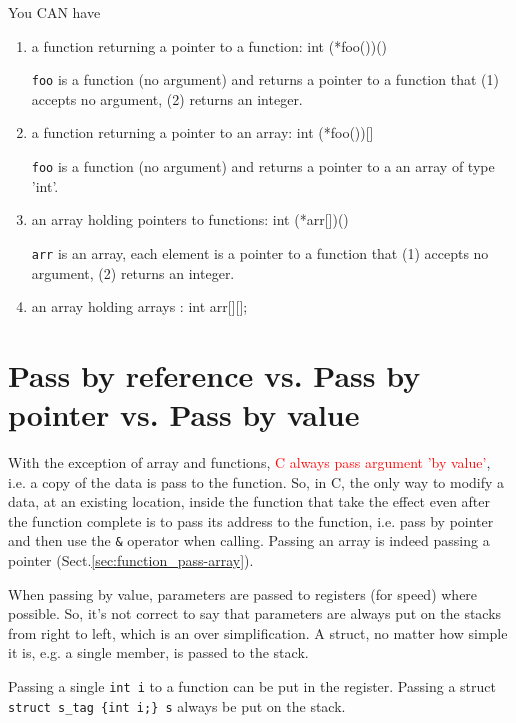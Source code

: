 You CAN have
\begin{enumerate}
  \item a function returning a pointer to a function: int (*foo())()

\verb!foo! is a function (no argument) and returns a pointer to a function
that (1) accepts no argument, (2) returns an integer.  
  
  \item a function returning a pointer to an array: int (*foo())[]
  
\verb!foo! is a function (no argument) and returns a pointer to a an array
of type 'int'.  
  
  \item an array holding pointers to functions: int (*arr[])()

\verb!arr! is an array, each element is a pointer to a function that
(1) accepts no argument, (2) returns an integer.  
    
  \item an array holding arrays : int arr[][];
  
  
\end{enumerate}

\section{Pass by reference vs. Pass by pointer vs. Pass by value}
\label{sec:pass-by-reference}
\label{sec:pass-by-pointer}
\label{sec:pass-by-value}



With the exception of array and functions, \textcolor{red}{C always pass
argument 'by value'}, i.e. a copy of the data is pass to the function. So, in C,
the only way to modify a data, at an existing location, inside the function that
take the effect even after the function complete is to pass its address to the
function, i.e. pass by pointer and then use the \verb!&! operator when calling.
Passing an array is indeed passing a pointer
(Sect.\ref{sec:function_pass-array}). 

\begin{mdframed}
When passing by value, parameters are passed to registers (for speed) where
possible. So, it's not correct to say that parameters are always put on the
stacks from right to left, which is an over simplification. A struct, no matter
how simple it is, e.g. a single member, is passed to the stack.

Passing a single \verb!int i! to a function can be put in the register. Passing
a struct \verb!struct s_tag {int i;} s! always be put on the stack. 
\end{mdframed}

